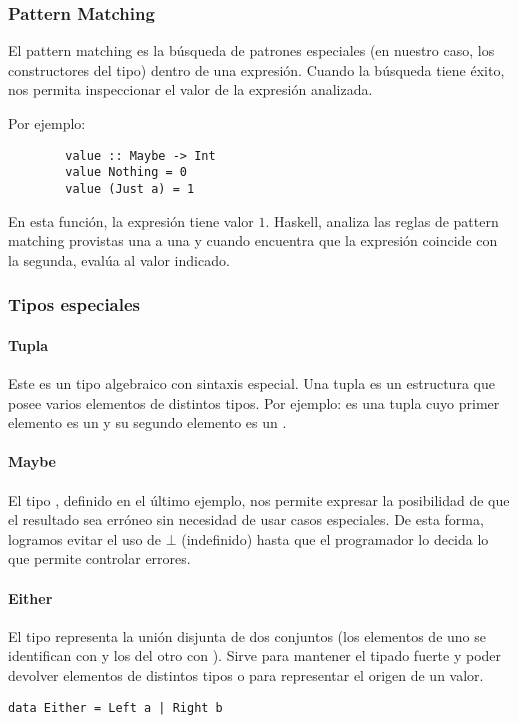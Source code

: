 \subsubsection{Pattern Matching}
El pattern matching es la búsqueda de patrones especiales (en nuestro caso, los constructores del tipo) dentro de una expresión. Cuando la búsqueda tiene éxito, nos permita inspeccionar el valor de la expresión analizada.

Por ejemplo:

\begin{centrado}
	\begin{verbatim}
		value :: Maybe -> Int 
		value Nothing = 0
		value (Just a) = 1
	\end{verbatim}
\end{centrado}

En esta función, la expresión  tiene valor $1$. Haskell, analiza las reglas de pattern matching provistas una a una y cuando encuentra que la expresión coincide con la segunda, evalúa al valor indicado.



\subsubsection{Tipos especiales}
\paragraph{Tupla} Este es un tipo algebraico con sintaxis especial. Una tupla es un estructura que posee varios elementos de distintos tipos. Por ejemplo:  es una tupla cuyo primer elemento es un  y su segundo elemento es un .

\paragraph{Maybe} El tipo , definido en el último ejemplo, nos permite expresar la posibilidad de que el resultado sea erróneo sin necesidad de usar casos especiales. De esta forma, logramos evitar el uso de $\bot$ (indefinido) hasta que el programador lo decida lo que permite controlar errores.

\paragraph{Either} El tipo  representa la unión disjunta de dos conjuntos (los elementos de uno se identifican con  y los del otro con ). Sirve para mantener el tipado fuerte y poder devolver elementos de distintos tipos o para representar el origen de un valor.
\begin{centrado}
	\begin{verbatim}
data Either = Left a | Right b
	\end{verbatim}
\end{centrado}

